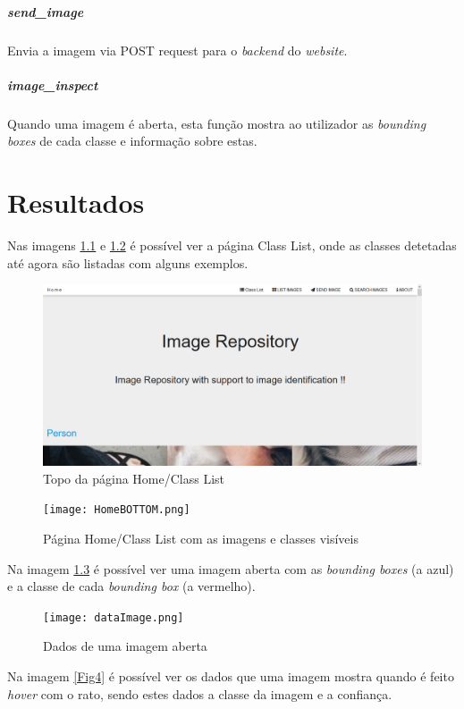 \documentclass{report}
\begin{document}
\paragraph{send\_image} Envia a imagem via POST request para o \textit{backend} do \textit{website}.
\paragraph{image\_inspect} Quando uma imagem é aberta, esta função mostra ao utilizador as \textit{bounding boxes} de cada classe e informação sobre estas. 


\chapter{Resultados}
\label{chap.resultados}
Nas imagens \ref{Fig1} e \ref{Fig2} é possível ver a página Class List, onde as classes detetadas até agora são listadas com alguns exemplos.  

\begin{figure}[H]
\includegraphics[width=\textwidth]{HomeTOP.png}
\caption{Topo da página Home/Class List}
\label{Fig1}
\end{figure}

\begin{figure}[H]
\texttt{[image: HomeBOTTOM.png]}
\caption{Página Home/Class List com as imagens e classes visíveis}
\label{Fig2}
\end{figure}

Na imagem \ref{Fig3} é possível ver uma imagem aberta com as \textit{bounding boxes} (a azul) e a classe de cada \textit{bounding box} (a vermelho).

\begin{figure}[H]
\texttt{[image: dataImage.png]}
\caption{Dados de uma imagem aberta}
\label{Fig3}
\end{figure}

Na imagem \ref{Fig4} é possível ver os dados que uma imagem mostra quando é feito \textit{hover} com o rato, sendo estes dados a classe da imagem e a confiança.
\end{document}
